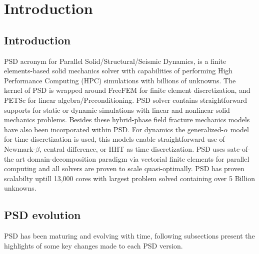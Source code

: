\chapter{Introduction} 

\section{Introduction} 
PSD acronym for Parallel Solid/Structural/Seismic Dynamics, is a finite elements-based solid mechanics solver with capabilities of performing High Performance Computing (HPC) simulations with billions of unknowns. The kernel of PSD is wrapped around FreeFEM for finite element discretization, and PETSc for linear algebra/Preconditioning. PSD solver contains straightforward supports for static or dynamic simulations with linear  and nonlinear solid mechanics problems. Besides these hybrid-phase field fracture mechanics models have also been incorporated within PSD. For dynamics the generalized-$\alpha$ model  for time discretization is used, this models enable straightforward use of Newmark-$\beta$, central difference, or HHT as time discretization. PSD uses sate-of-the art domain-decomposition paradigm via vectorial finite elements for parallel computing and all solvers are  proven to scale quasi-optimally. PSD has proven scalabilty uptill 13,000 cores with largest problem solved containing over 5 Billion unknowns.

\section{PSD evolution}
PSD has been maturing and evolving with time, following subsections present the highlights of  some key changes made to each PSD version. 


